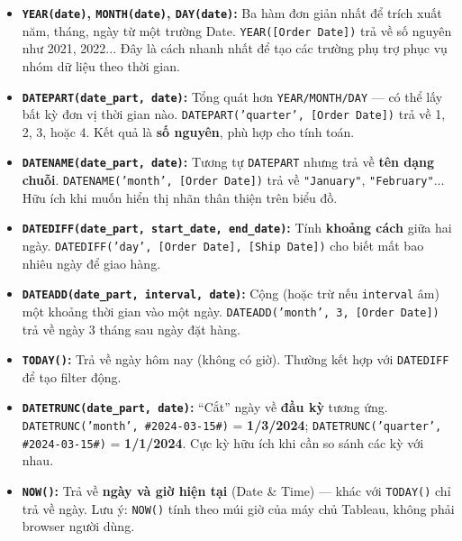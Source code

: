 \documentclass[12pt]{article}
\begin{document}
\begin{itemize}
    \item \textbf{\texttt{YEAR(date)}, \texttt{MONTH(date)}, \texttt{DAY(date)}:} Ba hàm đơn giản nhất để trích xuất năm, tháng, ngày từ một trường Date. \texttt{YEAR([Order Date])} trả về số nguyên như 2021, 2022... Đây là cách nhanh nhất để tạo các trường phụ trợ phục vụ nhóm dữ liệu theo thời gian.

    \item \textbf{\texttt{DATEPART(date\_part, date)}:} Tổng quát hơn \texttt{YEAR/MONTH/DAY} --- có thể lấy bất kỳ đơn vị thời gian nào. \texttt{DATEPART('quarter', [Order Date])} trả về 1, 2, 3, hoặc 4. Kết quả là \textbf{số nguyên}, phù hợp cho tính toán.

    \item \textbf{\texttt{DATENAME(date\_part, date)}:} Tương tự \texttt{DATEPART} nhưng trả về \textbf{tên dạng chuỗi}. \texttt{DATENAME('month', [Order Date])} trả về \texttt{"January"}, \texttt{"February"}... Hữu ích khi muốn hiển thị nhãn thân thiện trên biểu đồ.

    \item \textbf{\texttt{DATEDIFF(date\_part, start\_date, end\_date)}:} Tính \textbf{khoảng cách} giữa hai ngày. \texttt{DATEDIFF('day', [Order Date], [Ship Date])} cho biết mất bao nhiêu ngày để giao hàng.

    \item \textbf{\texttt{DATEADD(date\_part, interval, date)}:} Cộng (hoặc trừ nếu \texttt{interval} âm) một khoảng thời gian vào một ngày. \texttt{DATEADD('month', 3, [Order Date])} trả về ngày 3 tháng sau ngày đặt hàng.

    \item \textbf{\texttt{TODAY()}:} Trả về ngày hôm nay (không có giờ). Thường kết hợp với \texttt{DATEDIFF} để tạo filter động.

    \item \textbf{\texttt{DATETRUNC(date\_part, date)}:} ``Cắt'' ngày về \textbf{đầu kỳ} tương ứng. \texttt{DATETRUNC('month', \#2024-03-15\#)} = \textbf{1/3/2024}; \texttt{DATETRUNC('quarter', \#2024-03-15\#)} = \textbf{1/1/2024}. Cực kỳ hữu ích khi cần so sánh các kỳ với nhau.

    \item \textbf{\texttt{NOW()}:} Trả về \textbf{ngày và giờ hiện tại} (Date \& Time) --- khác với \texttt{TODAY()} chỉ trả về ngày. Lưu ý: \texttt{NOW()} tính theo múi giờ của máy chủ Tableau, không phải browser người dùng.


\end{itemize}
\end{document}
